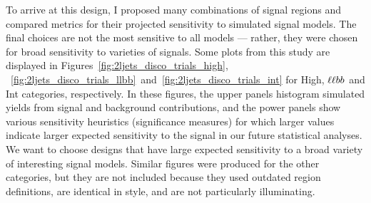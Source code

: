 To arrive at this design, I proposed many combinations of signal regions and
compared metrics for their projected sensitivity to simulated signal models.
The final choices are not the most sensitive to all models --- rather, they
were chosen for broad sensitivity to varieties of signals.
Some plots from this study are displayed in
Figures~\ref{fig:2ljets_disco_trials_high},
~\ref{fig:2ljets_disco_trials_llbb}~and~\ref{fig:2ljets_disco_trials_int}
for High, $\ell\ell bb$ and Int categories, respectively.
In these figures, the upper panels histogram simulated yields from signal and
background contributions, and the power panels show various sensitivity
heuristics (significance measures) for which larger values indicate larger
expected sensitivity to the signal in our future statistical analyses.
We want to choose designs that have large expected sensitivity to a broad
variety of interesting signal models.
Similar figures were produced for the other categories, but they are not
included because they used outdated region definitions, are identical in style,
and are not particularly illuminating.

